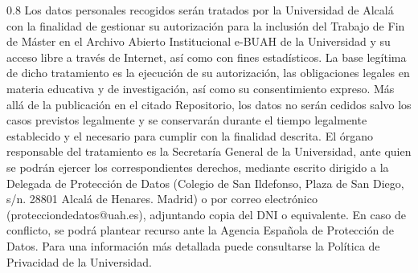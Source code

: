 \documentclass[11pt,a4paper,oneside]{article}
\begin{document}
\begin{spacing}{0.8}
\scriptsize Los datos personales recogidos serán tratados por la Universidad de
Alcalá con la finalidad de gestionar su autorización para la inclusión
del Trabajo de Fin de Máster en el Archivo Abierto Institucional
e-BUAH de la Universidad y su acceso libre a través de Internet, así
como con fines estadísticos. La base legítima de dicho tratamiento es
la ejecución de su autorización, las obligaciones legales en materia
educativa y de investigación, así como su consentimiento expreso. Más
allá de la publicación en el citado Repositorio, los datos no serán
cedidos salvo los casos previstos legalmente y se conservarán durante
el tiempo legalmente establecido y el necesario para cumplir con la
finalidad descrita. El órgano responsable del tratamiento es la
Secretaría General de la Universidad, ante quien se podrán ejercer los
correspondientes derechos, mediante escrito dirigido a la Delegada de
Protección de Datos (Colegio de San Ildefonso, Plaza de San Diego,
s/n. 28801 Alcalá de Henares. Madrid) o por correo electrónico
(protecciondedatos@uah.es), adjuntando copia del DNI o equivalente. En
caso de conflicto, se podrá plantear recurso ante la Agencia Española
de Protección de Datos. Para una información más detallada puede
consultarse la Política de Privacidad de la Universidad.
\end{spacing}




% 
\end{document}
